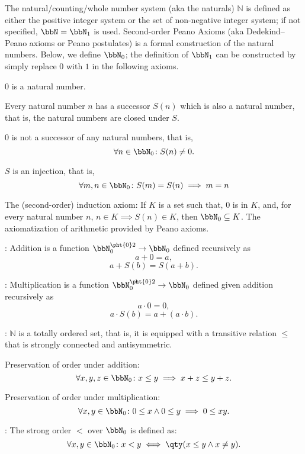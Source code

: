 \documentclass[a4paper,12pt]{report}
\begin{document}
\begin{itemizle}
The natural/counting/whole number system (aka the naturals) $\mathbb{N}$ is defined as either the positive integer system or the set of non-negative integer system; if not specified, $\bbN=\bbN_1$ is used.
Second-order Peano Axioms (aka Dedekind–Peano axioms or Peano postulates) is a formal construction of the natural numbers. Below, we define $\bbN_0$; the definition of $\bbN_1$ can be constructed by simply replace $0$ with $1$ in the following axioms.
\bit
\item $0$ is a natural number.
\item Every natural number $n$ has a successor $S(n)$ which is also a natural number, that is, the natural numbers are closed under $S$.
\item $0$ is not a successor of any natural numbers, that is,
\[\forall n\in\bbN_0\colon S(n)\neq 0.\]
\item $S$ is an injection, that is,
\[\forall m,n\in\bbN_0\colon S(m)=S(n)\implies m=n\]
\eit
\item The (second-order) induction axiom: If $K$ is a set such that, $0$ is in $K$, and, for every natural number $n$, $n\in K\implies S(n)\in K$, then $\bbN_0\subseteq K$.
\eit
{}
The axiomatization of arithmetic provided by Peano axioms.
\bit
\item {}: Addition is a function $\bbN_0^{\pht{0}2}\to\bbN_0$ defined recursively as
\[a+0=a,\]
\[a+S(b)=S(a+b).\]
\item {}: Multiplication is a function $\bbN_0^{\pht{0}2}\to\bbN_0$ defined given addition recursively as
\[a\cdot 0=0,\]
\[a\cdot S(b)=a+(a\cdot b).\]
\item {}: $\mathbb{N}$ is a totally ordered set, that is, it is equipped with a transitive relation $\leq$ that is strongly connected and antisymmetric.
\bit
\item Preservation of order under addition:
\[\forall x,y,z\in\bbN_0\colon x\leq y\implies x+z\leq y+z.\]
\item Preservation of order under multiplication:
\[\forall x,y\in\bbN_0\colon 0\leq x\land 0\leq y\implies 0\leq xy.\]
\eit
\item {}: The strong order $<$ over $\bbN_0$ is defined as:
\[\forall x,y\in\bbN_0\colon x<y\iff\qty(x\leq y\land x\neq y).\]
\eit
{}

\end{itemizle}
\end{document}
